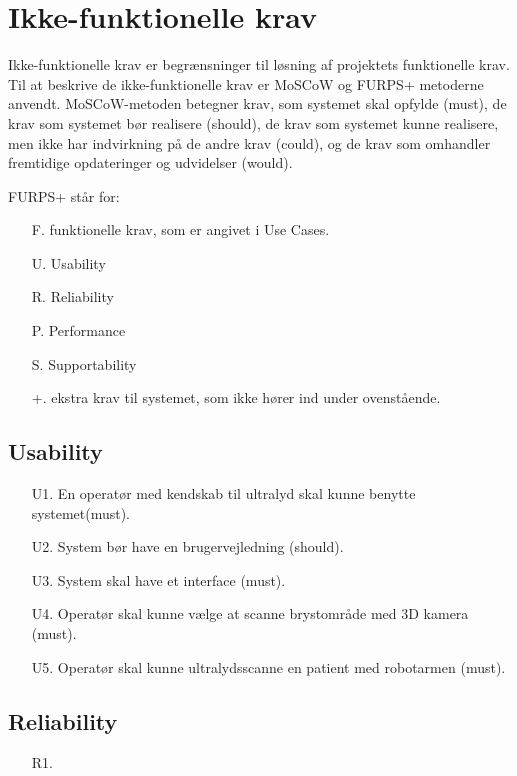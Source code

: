 \section{Ikke-funktionelle krav}\label{sect_IkFunk}
Ikke-funktionelle krav er begrænsninger til løsning af projektets funktionelle krav. Til at beskrive de ikke-funktionelle krav er MoSCoW og FURPS+ metoderne anvendt. 
MoSCoW-metoden betegner krav, som systemet skal opfylde (must), de krav som systemet bør realisere (should), de krav som systemet kunne realisere, men ikke har indvirkning på de andre krav (could), og de krav som omhandler fremtidige opdateringer og udvidelser (would).
  
FURPS+ står for:
\begin{enumerate}
 \item[F.] funktionelle krav, som er angivet i Use Cases.
\item[U.] Usability
\item[R.] Reliability
\item[P.] Performance 
\item[S.] Supportability 
\item[+.] ekstra krav til systemet, som ikke hører ind under ovenstående. 
\end{enumerate}

\subsection{Usability}
\begin{enumerate}
    \item[U1.] En operatør med kendskab til ultralyd skal kunne benytte systemet(must).
    \item[U2.] System bør have en brugervejledning (should). 
    \item[U3.] System skal have et interface (must).  
    \item[U4.] Operatør skal kunne vælge at scanne brystområde med 3D kamera (must). 
    \item[U5.] Operatør skal kunne ultralydsscanne en patient med robotarmen (must).  
\end{enumerate}

\subsection{Reliability}
\begin{enumerate}
    \item[R1.] 
\end{enumerate}

